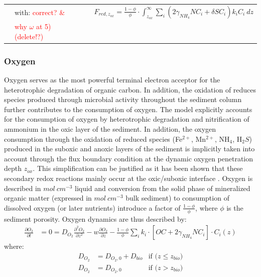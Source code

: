 \documentclass[gmd, manuscript]{copernicus}
\begin{document}
\begin{table}[tbp]
\begin{tabular}{ |l| l| l|}
&with:\textcolor{red}{ correct? \&}&$ \quad F_{red,z_{ox}}=\frac{1-\phi}{\phi} \cdot \int_{z_{ox}}^{\infty}  \sum_i \left( 2\gamma_{NH_4} NC_i + \delta SC_i \right) k_i C_i\ dz$ \\
&\textcolor{red}{why $\omega$ at 5) (delete!?)}&\\
\hline    
\end{tabular}
\label{Tab:BC_OM+O2}
\end{table}


\subsubsection{Oxygen}
Oxygen serves as the most powerful terminal electron acceptor for the heterotrophic degradation of organic carbon. In addition, the oxidation of reduces species produced through microbial activity throughout the 
sediment column further contributes to the consumption of oxygen. The model explicitly accounts for the consumption of oxygen by heterotrophic degradation and nitrification of ammonium in the oxic layer of the sediment. 
In addition, the oxygen consumption through the oxidation of reduced species (Fe$^{2+}$, Mn$^{2+}$, NH$_4$, H$_2S$) produced in the suboxic and anoxic layers of the sediment is implicitly taken into account through the flux 
boundary condition at the dynamic oxygen penetration depth $z_{ox}$. This simplification can be justified as it has been shown that these secondary redox reactions mainly occur at the oxic/suboxic interface \citep{soetaert_model_1996}.  
Oxygen is described in $mol\ cm^{-3}$ liquid and conversion from the solid phase of mineralized organic matter (expressed in $mol\ cm^{-3}$ bulk sediment) to consumption of dissolved oxygen (or later nutrients) introduce 
a factor of $\frac{1-\phi}{\phi}$, where $\phi$ is the sediment porosity. Oxygen dynamics are thus described by:
\begin{align} 
 \frac{\partial O_2}{\partial t} &= 0= D_{O_2}\frac{\partial^2 O_2 }{\partial z^2} - w\frac{\partial O_2}{\partial z} - \frac{1-\phi}{\phi}\sum_i k_i \cdot [ OC + 2 \gamma_{NH_4} NC_i ]\cdot C_{i}(z) \label{eq:ODE_O2_1}
\end{align}
where:
\begin{align}
 D_{O_2}&=D_{O_2, 0}+D_{bio}  &\text{if ($z\leq z_{bio}$)}\\
 D_{O_2}&=D_{O_2, 0}                &\text{if ($z > z_{bio}$)} 
\end{align}  
\end{document}
